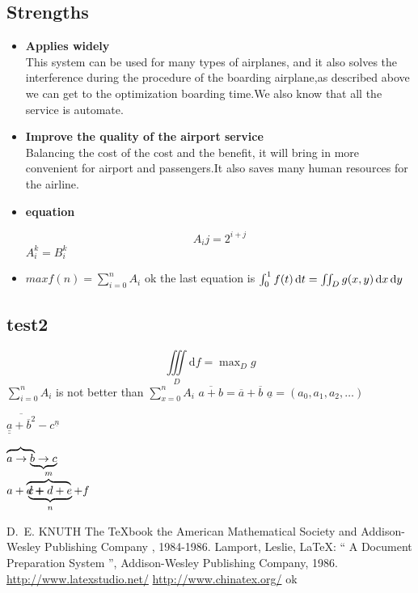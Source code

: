 \documentclass{mcmthesis}
\begin{document}
\subsection{Strengths}
\begin{itemize}
\item \textbf{Applies widely}\\
This  system can be used for many types of airplanes, and it also
solves the interference during  the procedure of the boarding
airplane,as described above we can get to the  optimization
boarding time.We also know that all the service is automate.

\item \textbf{Improve the quality of the airport service}\\
Balancing the cost of the cost and the benefit, it will bring in
more convenient  for airport and passengers.It also saves many
human resources for the airline. 

\item \textbf{equation}

\[
A_ij = 2^{i+j}
\]
$A_i^k = B_i^k$

\item $max f(n) = \sum_{i = 0}^n A_i$ ok the last equation is $\int_0^1 f(t) \mathop{}\!\mathrm{d} t
 = \iint_D g(x,y) \mathop{}\!\mathrm{d} x \mathop{}\!\mathrm{d} y$
\end{itemize}


\subsection{test2}
\[
 \iiint\limits_D \mathrm{d}f 
  = \max\nolimits_D g
\] $\sum\limits_{i = 0}^n A_i$ is not better than $\sum_{x = 0}^n A_i$
$\overline{a+b} = \overline a + \overline b$ $\underline a = (a_0, a_1, a_2, \dots)$

$ \overline{\underline{\underline a}
+ \overline{b}^2} - c^{\underline n}$

$\rlap{$\overbrace{\phantom{a \to b}}$} a \to \underbrace{b \to c}$\\
$a+\rlap{$\overbrace{d+\phantom{c+d}}^m$}\underbrace{c+d+e}_n+f$

\begin{thebibliography}{99}
 D.~E. KNUTH   The \TeX{}book  the American
Mathematical Society and Addison-Wesley
Publishing Company , 1984-1986.
Lamport, Leslie,  \LaTeX{}: `` A Document Preparation System '',
Addison-Wesley Publishing Company, 1986.
\url{http://www.latexstudio.net/}
\url{http://www.chinatex.org/}
ok
\end{thebibliography}
\end{document}
